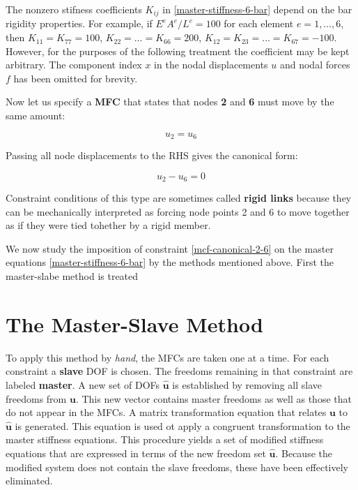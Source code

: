 \documentclass[10pt,b5paper,titlepage]{book}
\newcommand{\m}{\mathbf}
\begin{document}
The nonzero stifness coefficients $ K_{ij} $ in \eqref{master-stiffness-6-bar}
depend on the bar rigidity properties. For example, if
$ E^e A^e / L^e = 100 $ for each element $ e = 1, \dots , 6 $, then
$ K_{11} = K_{77} = 100 $, $ K_{22} = \dots = K_{66} = 200 $,
$ K_{12} = K_{23} = \dots = K_{67} = -100 $. However, for the purposes of the
following treatment the coefficient may be kept arbitrary. The component index
$ x $ in the nodal displacements $ u $ and nodal forces $ f $ has been omitted
for brevity.

Now let us specify a \textbf{MFC} that states that nodes \textbf{2} and \textbf{6}
must move by the same amount:

\begin{equation}\label{mfc-2-6}
    u_2 = u_6
\end{equation}

Passing all node displacements to the RHS gives the canonical form:

\begin{equation}\label{mcf-canonical-2-6}
    u_2 - u_6 = 0
\end{equation}

Constraint conditions of this type are sometimes called \textbf{rigid links}
because they can be mechanically interpreted as forcing node points 2 and 6
to move together as if they were tied tohether by a rigid member.

We now study the imposition of constraint \eqref{mcf-canonical-2-6} on the master equations
\eqref{master-stiffness-6-bar} by the methods mentioned above. First the master-slabe
method is treated

\section{The Master-Slave Method}

To apply this method by \textit{hand}, the MFCs are taken one at a time. For each
constraint a \textbf{slave} DOF is chosen. The freedoms remaining in that constraint
are labeled \textbf{master}. A new set of DOFs $ \m{\hat{u}} $ is established
by removing all slave freedoms from $ \m{u} $. This new vector contains
master freedoms as well as those that do not appear in the MFCs. A matrix transformation
equation that relates $ \m{u} $ to $ \m{\hat{u}} $ is generated. This
equation is used ot apply a congruent transformation to the master stiffness equations.
This procedure yields a set of modified stiffness equations that are expressed in terms
of the new freedom set $ \m{\hat{u}} $. Because the modified system does not contain
the slave freedoms, these have been effectively eliminated.
\end{document}
